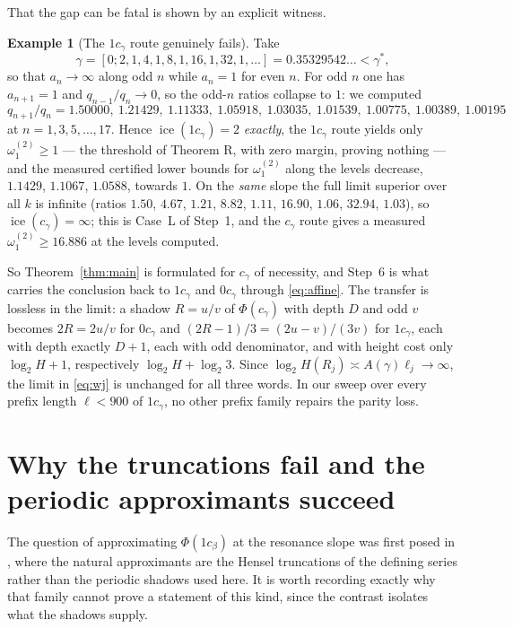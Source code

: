 \documentclass[11pt,reqno]{amsart}
\theoremstyle{plain}
\theoremstyle{definition}
\newtheorem{example}[theorem]{Example}
\DeclareMathOperator{\ice}{ice}
\newcommand{\PH}{\Phi}
\newcommand{\gs}{\gamma^{*}}
\newcommand{\Av}{A(\gamma)}
\newcommand{\om}{\omega_1^{(2)}}
\begin{document}
That the gap can be fatal is shown by an explicit witness.

\begin{example}[The $1c_\gamma$ route genuinely fails]\label{ex:witness}
Take
\[
  \gamma=[0;2,1,4,1,8,1,16,1,32,1,\dots]=0.35329542\ldots<\gs,
\]
so that $a_n\to\infty$ along odd $n$ while $a_n=1$ for even $n$. For odd $n$ one has $a_{n+1}=1$
and $q_{n-1}/q_n\to0$, so the odd-$n$ ratios collapse to $1$: we computed
\[
  q_{n+1}/q_n=1.50000,\ 1.21429,\ 1.11333,\ 1.05918,\ 1.03035,\ 1.01539,\ 1.00775,\ 1.00389,\ 1.00195
\]
at $n=1,3,5,\dots,17$. Hence $\ice(1c_\gamma)=2$ \emph{exactly}, the $1c_\gamma$ route yields only
$\om\ge1$ --- the threshold of Theorem R, with zero margin, proving nothing --- and the measured
certified lower bounds for $\om$ along the levels decrease, $1.1429$, $1.1067$, $1.0588$, towards
$1$. On the \emph{same} slope the full limit superior over all $k$ is infinite (ratios
$1.50$, $4.67$, $1.21$, $8.82$, $1.11$, $16.90$, $1.06$, $32.94$, $1.03$), so
$\ice(c_\gamma)=\infty$; this is Case~L of Step~1, and the $c_\gamma$ route gives a measured
$\om\ge16.886$ at the levels computed.
\end{example}

So Theorem~\ref{thm:main} is formulated for $c_\gamma$ of necessity, and Step~6 is what carries the
conclusion back to $1c_\gamma$ and $0c_\gamma$ through \eqref{eq:affine}. The transfer is lossless
in the limit: a shadow $R=u/v$ of $\PH(c_\gamma)$ with depth $D$ and odd $v$ becomes $2R=2u/v$ for
$0c_\gamma$ and $(2R-1)/3=(2u-v)/(3v)$ for $1c_\gamma$, each with depth exactly $D+1$, each with
odd denominator, and with height cost only $\log_2 H+1$, respectively $\log_2 H+\log_2 3$. Since
$\log_2 H(R_j)\asymp\Av\ell_j\to\infty$, the limit in \eqref{eq:wj} is unchanged for all three
words. In our sweep over every prefix length $\ell<900$ of $1c_\gamma$, no other prefix family repairs
the parity loss.

\section{Why the truncations fail and the periodic approximants succeed}\label{sec:truncations}

The question of approximating $\PH(1c_\beta)$ at the resonance slope was first posed in
\cite{DJedge}, where the natural approximants are the Hensel truncations of the defining series
rather than the periodic shadows used here. It is worth recording exactly why that family cannot
prove a statement of this kind, since the contrast isolates what the shadows supply.
\end{document}
